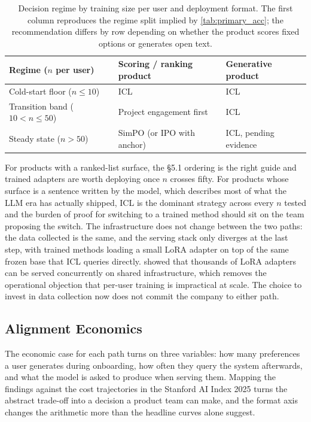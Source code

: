 \begin{table}[h]
\centering
\caption{Decision regime by training size per user and deployment format. The first column reproduces the regime split implied by \cref{tab:primary_acc}; the recommendation differs by row depending on whether the product scores fixed options or generates open text.}
\label{tab:business_regimes}
\begin{tabular}{lll}
\toprule
\textbf{Regime ($n$ per user)} & \textbf{Scoring / ranking product} & \textbf{Generative product} \\
\midrule
Cold-start floor ($n \leq 10$)        & ICL          & ICL \\
Transition band ($10 < n \leq 50$)    & Project engagement first   & ICL \\
Steady state ($n > 50$)               & SimPO (or IPO with anchor) & ICL, pending evidence \\
\bottomrule
\end{tabular}
\end{table}

For products with a ranked-list surface, the §5.1 ordering is the right guide and trained adapters are worth deploying once $n$ crosses fifty. For products whose surface is a sentence written by the model, which describes most of what the LLM era has actually shipped, ICL is the dominant strategy across every $n$ tested and the burden of proof for switching to a trained method should sit on the team proposing the switch. The infrastructure does not change between the two paths: the data collected is the same, and the serving stack only diverges at the last step, with trained methods loading a small LoRA adapter on top of the same frozen base that ICL queries directly. \citet{sheng2024slora} showed that thousands of LoRA adapters can be served concurrently on shared infrastructure, which removes the operational objection that per-user training is impractical at scale. The choice to invest in data collection now does not commit the company to either path.

\subsection{Alignment Economics}
\label{sec:business:economics}

The economic case for each path turns on three variables: how many preferences a user generates during onboarding, how often they query the system afterwards, and what the model is asked to produce when serving them. Mapping the findings against the cost trajectories in the Stanford AI Index 2025 \citep{maslej2025aiindex} turns the abstract trade-off into a decision a product team can make, and the format axis changes the arithmetic more than the headline curves alone suggest.

